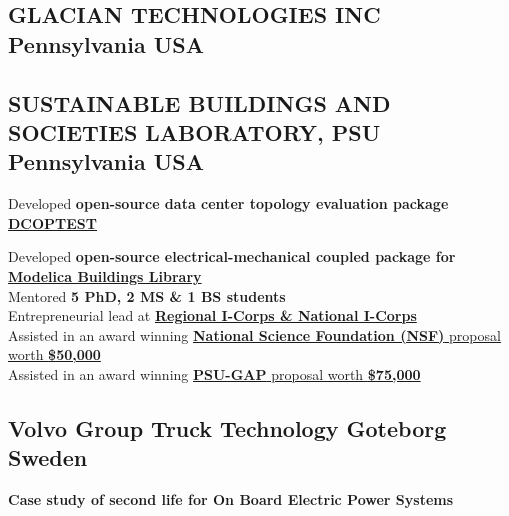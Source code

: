 \documentclass[]{Keval-resume}
\begin{document}
\sectionsep
\subsection{GLACIAN TECHNOLOGIES INC
\hfill \normalfont P\lowercase{ennsylvania} USA}

\sectionsep
\subsection{SUSTAINABLE BUILDINGS AND SOCIETIES LABORATORY, PSU
\hfill \normalfont P\lowercase{ennsylvania} USA}
\hspace{1.5em} \textbullet{}  {Developed \textbf{open-source data center topology evaluation package \href{https://github.com/ViswanathanGanesh01/DCOPTEST}{DCOPTEST}}\\
\hspace{1.5em} \textbullet{}  {Developed \textbf{open-source electrical-mechanical coupled package for \href{https://simulationresearch.lbl.gov/modelica/}{Modelica Buildings Library}}\\
\hspace{1.5em} \textbullet{}  {Mentored \textbf{5 PhD, 2 MS \& 1 BS students}}\\
\hspace{1.5em} \textbullet{}  Entrepreneurial lead at \href{https://www.credly.com/badges/f8ce1619-6645-4229-aa98-c54a8b12cfe6/linked_in_profile}{\textbf{Regional I-Corps \& National I-Corps}}\\
\hspace{1.5em} \textbullet{}  {Assisted in an award winning \href{https://www.nsf.gov/awardsearch/showAward?AWD_ID=2437906&HistoricalAwards=false}{\textbf{National Science Foundation (NSF)} proposal worth \textbf{\$50,000}}}\\
\hspace{1.5em} \textbullet{}  {Assisted in an award winning \href{https://sites.psu.edu/sbslab/research/buildings/psu-gap-datacenter/}{\textbf{PSU-GAP} proposal worth \textbf{\$75,000}}}\\
\sectionsep

\subsection{Volvo Group Truck Technology
 \hfill \normalfont G\lowercase{oteborg} S\lowercase{weden}}
\hspace{1.5em} \textbullet{}  \textbf{Case study of second life for On Board Electric Power Systems}

}}
\end{document}
